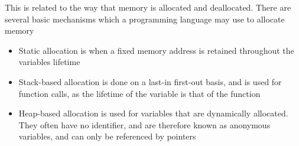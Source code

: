 This is related to the way that memory is allocated and deallocated. There are several basic mechanisms which a programming
 language may use to allocate memory
\begin{itemize}
  \item Static allocation is when a fixed memory address is retained throughout the variables lifetime
  \item Stack-based allocation is done on a last-in first-out basis, and is used for function calls, as the lifetime of
   the variable is that of the function
  \item Heap-based allocation is used for variables that are dynamically allocated. They often have no identifier, and
   are therefore known as anonymous variables, and can only be referenced by pointers
\end{itemize}